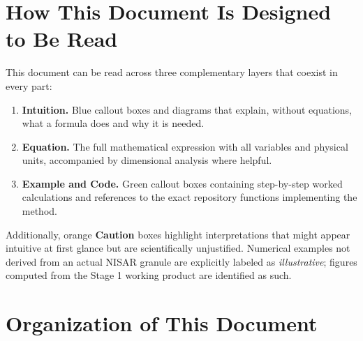 \documentclass[11pt,a4paper]{article}
\begin{document}
\section{How This Document Is Designed to Be Read}
\label{sec:como-leer}

This document can be read across three complementary layers that coexist in every part:
\begin{enumerate}
  \item \textbf{Intuition.} Blue callout boxes and diagrams that explain, without equations, what a formula does and why it is needed.
  \item \textbf{Equation.} The full mathematical expression with all variables and physical units, accompanied by dimensional analysis where helpful.
  \item \textbf{Example and Code.} Green callout boxes containing step-by-step worked calculations and references to the exact repository functions implementing the method.
\end{enumerate}
Additionally, orange \textbf{Caution} boxes highlight interpretations that might appear intuitive at first glance but are scientifically unjustified. Numerical examples not derived from an actual NISAR granule are explicitly labeled as \emph{illustrative}; figures computed from the Stage 1 working product are identified as such.

\section{Organization of This Document}
\label{sec:organizacion}
\end{document}
